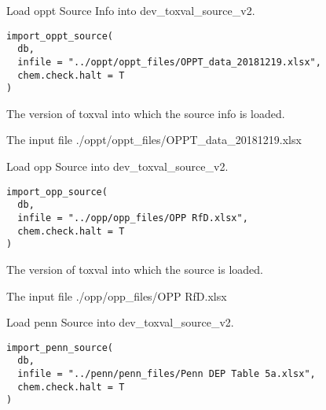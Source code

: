 \documentclass[letterpaper]{book}
\begin{document}
%
\begin{Description}\relax
Load oppt Source Info into dev\_toxval\_source\_v2.
\end{Description}
%
\begin{Usage}
\begin{verbatim}
import_oppt_source(
  db,
  infile = "../oppt/oppt_files/OPPT_data_20181219.xlsx",
  chem.check.halt = T
)
\end{verbatim}
\end{Usage}
%
\begin{Arguments}
\begin{ldescription}
\item[\code{db}] The version of toxval into which the source info is loaded.

\item[\code{infile}] The input file ./oppt/oppt\_files/OPPT\_data\_20181219.xlsx
\end{ldescription}
\end{Arguments}
%
\begin{Description}\relax
Load opp Source into dev\_toxval\_source\_v2.
\end{Description}
%
\begin{Usage}
\begin{verbatim}
import_opp_source(
  db,
  infile = "../opp/opp_files/OPP RfD.xlsx",
  chem.check.halt = T
)
\end{verbatim}
\end{Usage}
%
\begin{Arguments}
\begin{ldescription}
\item[\code{db}] The version of toxval into which the source is loaded.

\item[\code{infile}] The input file ./opp/opp\_files/OPP RfD.xlsx
\end{ldescription}
\end{Arguments}
%
\begin{Description}\relax
Load penn Source into dev\_toxval\_source\_v2.
\end{Description}
%
\begin{Usage}
\begin{verbatim}
import_penn_source(
  db,
  infile = "../penn/penn_files/Penn DEP Table 5a.xlsx",
  chem.check.halt = T
)
\end{verbatim}
\end{Usage}
\end{document}
